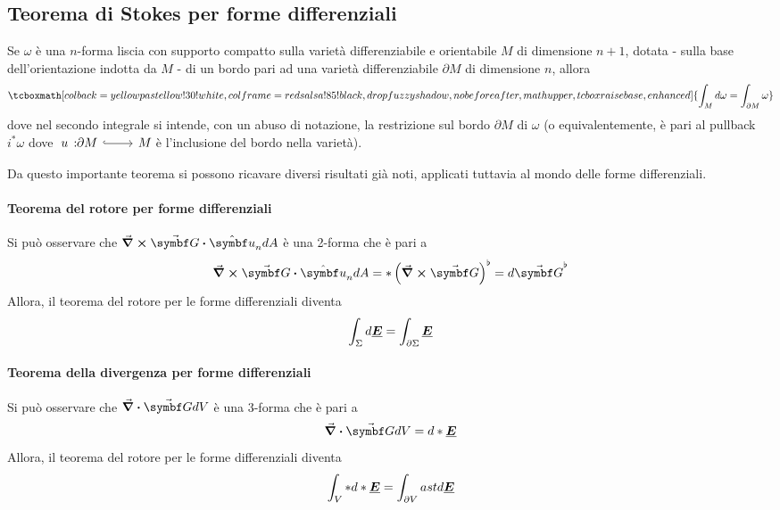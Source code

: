 \subsection{Teorema di Stokes per forme differenziali}
\begin{theoremaqed}
	Se $\omega$ è una $n$-forma liscia con supporto compatto sulla varietà differenziabile e orientabile $M$ di dimensione $n+1$, dotata - sulla base dell'orientazione indotta da $M$ - di un bordo pari ad una varietà differenziabile $\partial M$ di dimensione $n$, allora
	\begin{equation*}
		\tcboxmath[colback=yellowpastellow!30!white,colframe=redsalsa!85!black,drop fuzzy shadow, nobeforeafter, math upper, tcbox raise base, enhanced]{\int_{M}d\omega=\int_{\partial M}\omega}
	\end{equation*}
dove nel secondo integrale si intende, con un abuso di notazione, la restrizione sul bordo $\partial M$ di $\omega$ (o equivalentemente, è pari al pullback $i^{\ast}\omega$ dove $\ \incl[u]{\partial M}{M}$ è l'inclusione del bordo nella varietà).
\end{theoremaqed}
Da questo importante teorema si possono ricavare diversi risultati già noti, applicati tuttavia al mondo delle forme differenziali.
\paragraph{Teorema del rotore per forme differenziali}
Si può osservare che $\curl{\vba{G}}\vdot \vbh{u}_n dA$ è una 2-forma che è pari a
\begin{equation*}
	\curl{\vba{G}}\vdot \vbh{u}_n dA=\ast\left(\curl{\vba{G}}\right)^\flat=d\vba{G}^\flat
\end{equation*}%
Allora, il teorema del rotore per le forme differenziali diventa
\begin{equation}
	\int_\Sigma d\vb*{\underline{E}}=\int_{\partial \Sigma}\vb*{\underline{E}}
\end{equation}
\paragraph{Teorema della divergenza per forme differenziali}
Si può osservare che $\div{\vba{G}}dV$ è una 3-forma che è pari a
\begin{equation*}
	\div{\vba{G}}dV=d\ast\fb{E}
\end{equation*}%
Allora, il teorema del rotore per le forme differenziali diventa
\begin{equation}
	\int_V \ast d\ast\vb*{\underline{E}}=\int_{\partial V}ast d\vb*{\underline{E}}
\end{equation}
